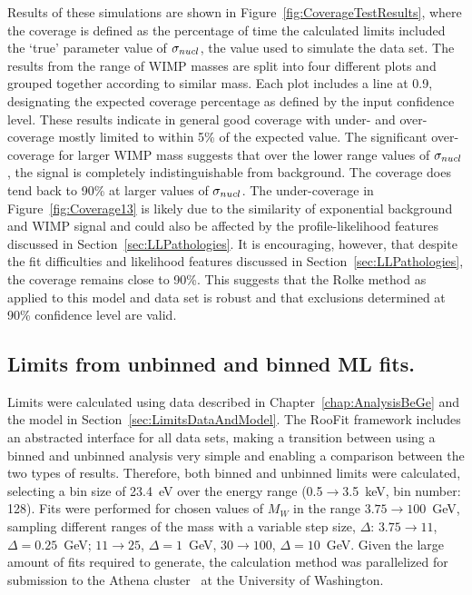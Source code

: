 Results of these simulations are shown in Figure~\ref{fig:CoverageTestResults}, where the coverage is defined as the percentage of time the calculated limits included the `true' parameter value of $\sigma_{nucl}$, the value used to simulate the data set.  The results from the range of WIMP masses are split into four different plots and grouped together according to similar mass.  Each plot includes a line at 0.9, designating the expected coverage percentage as defined by the input confidence level.  These results indicate in general good coverage with under- and over-coverage mostly limited to within 5\% of the expected value.  The significant over-coverage for larger WIMP mass suggests that over the lower range values of $\sigma_{nucl}$, the signal is completely indistinguishable from background.  The coverage does tend back to 90\% at larger values of $\sigma_{nucl}$.  The under-coverage in Figure~\ref{fig:Coverage13} is likely due to the similarity of exponential background and WIMP signal and could also be affected by the profile-likelihood features discussed in Section~\ref{sec:LLPathologies}.  It is encouraging, however, that despite the fit difficulties and likelihood features discussed in Section~\ref{sec:LLPathologies}, the coverage remains close to 90\%.  This suggests that the Rolke method as applied to this model and data set is robust and that exclusions determined at 90\% confidence level are valid.

		\subsection{Limits from unbinned and binned ML fits.}
		\label{sec:LimitsUnbinned}

Limits were calculated using data described in Chapter~\ref{chap:AnalysisBeGe} and the model in Section~\ref{sec:LimitsDataAndModel}.  The RooFit framework includes an abstracted interface for all data sets, making a transition between using a binned and unbinned analysis very simple and enabling a comparison between the two types of results.  Therefore, both binned and unbinned limits were calculated, selecting a bin size of 23.4~eV over the energy range (0.5$\to$3.5~keV, bin number: 128).  
Fits were performed for chosen values of $M_{W}$ in the range $3.75\to100$~GeV, sampling different ranges of the mass with a variable step size, $\Delta$: $3.75\to11$, $\Delta=0.25$~GeV; $11\to25$, $\Delta=1$~GeV, $30\to100$, $\Delta=10$~GeV.  Given the large amount of fits required to generate, the calculation method was parallelized for submission to the Athena cluster~\cite{Athena} at the University of Washington.  
